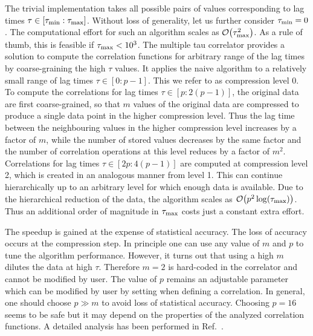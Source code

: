The trivial implementation takes all possible pairs of values
corresponding to lag times $\tau \in [\tau_{\mathrm{min}}:\tau_{\mathrm{max}}]$. 
Without loss of generality, let us further consider $\tau_{\mathrm{min}}=0$.
The computational effort for such an algorithm scales
as ${\cal O} \bigl(\tau_{\mathrm{max}}^2\bigr)$.
As a rule of thumb, this is feasible if $\tau_{\mathrm{max}} < 10^3$.
The multiple tau correlator provides a solution to compute the
correlation functions for arbitrary range of the lag times by
coarse-graining the high $\tau$ values. It applies the naive algorithm
to a relatively small range of lag times $\tau \in [0:p-1]$. This we refer
to as compression level 0. To compute the correlations for lag times
$\tau \in [p:2(p-1)]$, the original data are first coarse-grained, so
that $m$ values of the original data are compressed to produce a single
data point in the higher compression level. Thus the lag time between
the neighbouring values in the higher compression level increases
by a factor of $m$, while the number of stored values decreases by
the same factor and the number of correlation operations at this level
reduces by a factor of $m^2$. Correlations for lag times 
$\tau \in [2p:4(p-1)]$ are computed at compression level 2, which is created
in an analogous manner from level 1. This can continue hierarchically
up to an arbitrary level for which enough data is available. Due to the
hierarchical reduction of the data, the algorithm scales as 
${\cal O} \bigl( p^2 \log(\tau_{\mathrm{max}}) \bigr)$. Thus an additional order
of magnitude in $\tau_{\mathrm{max}}$ costs just a constant extra effort.

The speedup is gained at the expense of statistical accuracy.
The loss of accuracy occurs at the compression step.
In principle one can use any value of $m$ and $p$ to tune the algorithm
performance. However, it turns out that using a high $m$ dilutes the
data at high $\tau$. Therefore $m=2$ is hard-coded in the \es correlator
and cannot be modified by user. The value of $p$ remains an adjustable
parameter which can be modified by user by setting 
when defining a correlation. In general, one should choose $p \gg m$
to avoid loss of statistical accuracy. Choosing $p=16$ seems to be
safe but it may depend on the properties of the analyzed
correlation functions. A detailed analysis has been performed
in Ref.~\cite{ramirez10a}.

